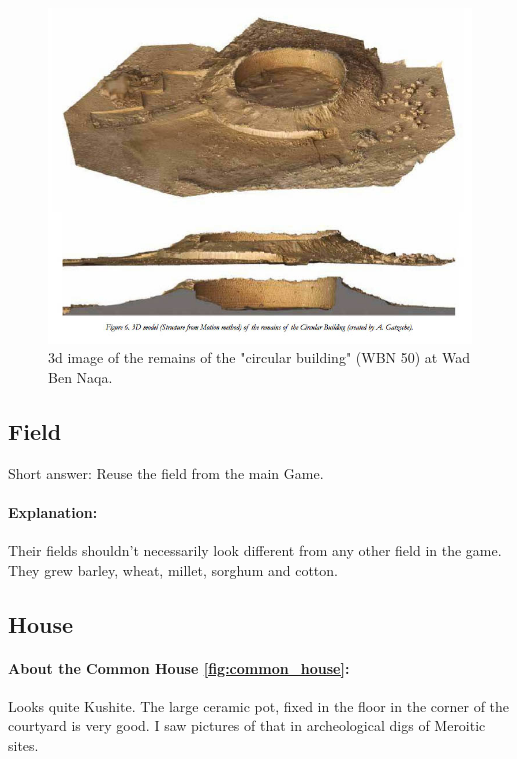 \documentclass[a4paper,12pt]{scrreprt}
\begin{document}
\begin{figure}[H]
	\centering
	\includegraphics[width=\textwidth]{img/farmstead/3d_reconstruction_circular_building}
	\caption{3d image of the remains of the "circular building" (WBN 50) at Wad Ben Naqa.}
\end{figure}

\subsection{Field}

Short answer: Reuse the field from the main Game.

\paragraph{Explanation:}

Their fields shouldn’t necessarily look different from any other field in the game. They grew barley, wheat, millet, sorghum and cotton.

\subsection{House}

\paragraph{About the Common House \ref{fig:common_house}:} Looks quite Kushite. The large ceramic pot, fixed in the floor in the corner of the courtyard is very good. I saw pictures of that in archeological digs of Meroitic sites.\\
\end{document}

